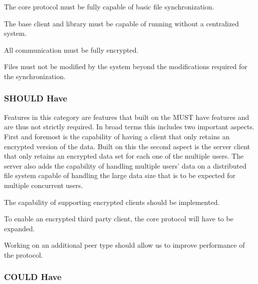 \begin{description}[leftmargin=16em,style=nextline,noitemsep,nolistsep]
\item[File Synchronization Protocol]
    The core protocol must be fully capable of basic file synchronization.
\item[Peer to Peer Architecture]
    The base client and library must be capable of running without a centralized system.
\item[Secure Transport]
    All communication must be fully encrypted.
\item[Object Atomicity]
    Files must not be modified by the system beyond the modifications required for the synchronization.
\end{description}

\subsubsection{SHOULD Have}
\label{subs:SHOULD Have}

Features in this category are features that built on the MUST have features and are thus not strictly required.
In broad terms this includes two important aspects.
First and foremost is the capability of having a client that only retains an encrypted version of the data.
Built on this the second aspect is the server client that only retains an encrypted data set for each one of the multiple users.
The server also adds the capability of handling multiple users' data on a distributed file system capable of handling the large data size that is to be expected for multiple concurrent users.

\begin{description}[leftmargin=10em,style=nextline,noitemsep,nolistsep]
\item[Third Party Client]
    The capability of supporting encrypted clients should be implemented.
\item[Protocol Extension]
    To enable an encrypted third party client, the core protocol will have to be expanded.
\item[Performance]
    Working on an additional peer type should allow us to improve performance of the protocol.
\end{description}

\subsubsection{COULD Have}
\label{subs:COULD Have}

